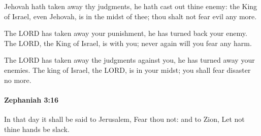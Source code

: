 			\begin{versebox}
					\item[BHS] 
					\item[LXX] 
					\item[ASV] Jehovah hath taken away thy judgments, he hath cast out thine enemy: the King of Israel, even Jehovah, is in the midst of thee; thou shalt not fear evil any more.
					\item[NIV] The LORD has taken away your punishment, he has turned back your enemy. The LORD, the King of Israel, is with you; never again will you fear any harm.
					\item[NRSV] The LORD has taken away the judgments against you, he has turned away your enemies. The king of Israel, the LORD, is in your midst; you shall fear disaster no more.
			\end{versebox}

		\paragraph{Zephaniah 3:16} %
			\label{ZEPHANIAH-3-16}

			In that day it shall be said to Jerusalem, Fear thou not: and to Zion, Let not thine hands be slack.


